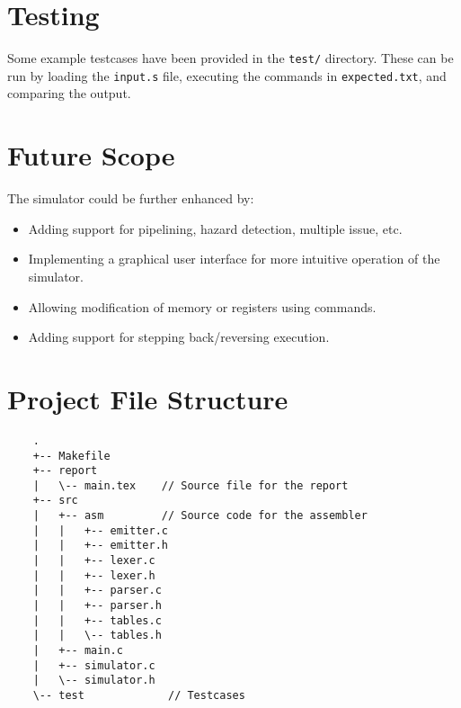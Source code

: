 \documentclass{article}
\begin{document}
\section{Testing}

Some example testcases have been provided in the \texttt{test/} directory. These
can be run by loading the \texttt{input.s} file, executing the commands in \texttt{expected.txt},
and comparing the output.

\section{Future Scope}

The simulator could be further enhanced by:
\begin{itemize}
    \item Adding support for pipelining, hazard detection, multiple issue, etc.
    \item Implementing a graphical user interface for more intuitive operation of the simulator. 
    \item Allowing modification of memory or registers using commands.
    \item Adding support for stepping back/reversing execution.
\end{itemize}

\section{Project File Structure}

\begin{verbatim}
    .
    +-- Makefile
    +-- report
    |   \-- main.tex    // Source file for the report
    +-- src
    |   +-- asm         // Source code for the assembler
    |   |   +-- emitter.c
    |   |   +-- emitter.h
    |   |   +-- lexer.c
    |   |   +-- lexer.h
    |   |   +-- parser.c
    |   |   +-- parser.h
    |   |   +-- tables.c
    |   |   \-- tables.h
    |   +-- main.c
    |   +-- simulator.c
    |   \-- simulator.h
    \-- test             // Testcases 
\end{verbatim}
\end{document}

